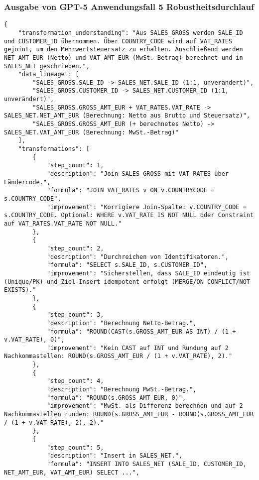 \subsubsection{Ausgabe von GPT-5 Anwendungsfall 5 Robustheitsdurchlauf}\label{anhang:subsubsec:gpt_case5_prompt3}
\begin{lstlisting}[caption={Ausgabe: GPT-5 Anwendungsfall 5 Robustheitsdurchlauf},label={gpt_case5_prompt3}]
{
    "transformation_understanding": "Aus SALES_GROSS werden SALE_ID und CUSTOMER_ID übernommen. Über COUNTRY_CODE wird auf VAT_RATES gejoint, um den Mehrwertsteuersatz zu erhalten. Anschließend werden NET_AMT_EUR (Netto) und VAT_AMT_EUR (MwSt.-Betrag) berechnet und in SALES_NET geschrieben.",
    "data_lineage": [
        "SALES_GROSS.SALE_ID -> SALES_NET.SALE_ID (1:1, unverändert)",
        "SALES_GROSS.CUSTOMER_ID -> SALES_NET.CUSTOMER_ID (1:1, unverändert)",
        "SALES_GROSS.GROSS_AMT_EUR + VAT_RATES.VAT_RATE -> SALES_NET.NET_AMT_EUR (Berechnung: Netto aus Brutto und Steuersatz)",
        "SALES_GROSS.GROSS_AMT_EUR (+ berechnetes Netto) -> SALES_NET.VAT_AMT_EUR (Berechnung: MwSt.-Betrag)"
    ],
    "transformations": [
        {
            "step_count": 1,
            "description": "Join SALES_GROSS mit VAT_RATES über Ländercode.",
            "formula": "JOIN VAT_RATES v ON v.COUNTRYCODE = s.COUNTRY_CODE",
            "improvement": "Korrigiere Join-Spalte: v.COUNTRY_CODE = s.COUNTRY_CODE. Optional: WHERE v.VAT_RATE IS NOT NULL oder Constraint auf VAT_RATES.VAT_RATE NOT NULL."
        },
        {
            "step_count": 2,
            "description": "Durchreichen von Identifikatoren.",
            "formula": "SELECT s.SALE_ID, s.CUSTOMER_ID",
            "improvement": "Sicherstellen, dass SALE_ID eindeutig ist (Unique/PK) und Ziel-Insert idempotent erfolgt (MERGE/ON CONFLICT/NOT EXISTS)."
        },
        {
            "step_count": 3,
            "description": "Berechnung Netto-Betrag.",
            "formula": "ROUND(CAST(s.GROSS_AMT_EUR AS INT) / (1 + v.VAT_RATE), 0)",
            "improvement": "Kein CAST auf INT und Rundung auf 2 Nachkommastellen: ROUND(s.GROSS_AMT_EUR / (1 + v.VAT_RATE), 2)."
        },
        {
            "step_count": 4,
            "description": "Berechnung MwSt.-Betrag.",
            "formula": "ROUND(s.GROSS_AMT_EUR, 0)",
            "improvement": "MwSt. als Differenz berechnen und auf 2 Nachkommastellen runden: ROUND(s.GROSS_AMT_EUR - ROUND(s.GROSS_AMT_EUR / (1 + v.VAT_RATE), 2), 2)."
        },
        {
            "step_count": 5,
            "description": "Insert in SALES_NET.",
            "formula": "INSERT INTO SALES_NET (SALE_ID, CUSTOMER_ID, NET_AMT_EUR, VAT_AMT_EUR) SELECT ...",

\end{lstlisting}
